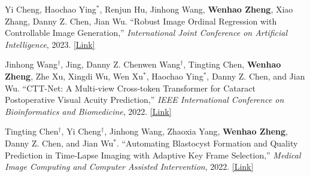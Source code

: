 \begin{cventries}
{\begin{cvitemize2}
            \vspace{1mm}
            \item Yi Cheng, Haochao Ying$^*$, Renjun Hu, Jinhong Wang, \textbf{Wenhao Zheng}, Xiao Zhang, Danny Z. Chen, Jian Wu. ``Robust Image Ordinal Regression with Controllable Image Generation,'' \textit{International Joint Conference on Artificial Intelligence}, 2023. \href{https://arxiv.org/abs/2305.04213}{\textcolor{link}{[Link]}}
            \vspace{1mm}
            \item Jinhong Wang$^\dagger$, Jing, Danny Z. Chenwen Wang$^\dagger$, Tingting Chen, \textbf{Wenhao Zheng}, Zhe Xu, Xingdi Wu, Wen Xu$^*$, Haochao Ying$^*$, Danny Z. Chen, and Jian Wu. ``CTT-Net: A Multi-view Cross-token Transformer for Cataract Postoperative Visual Acuity Prediction,'' \textit{IEEE International Conference on Bioinformatics and Biomedicine}, 2022. \href{https://ieeexplore.ieee.org/document/9995392}{\textcolor{link}{[Link]}}
            \vspace{1mm}
            \item Tingting Chen$^\dagger$, Yi Cheng$^\dagger$, Jinhong Wang, Zhaoxia Yang, \textbf{Wenhao Zheng}, Danny Z. Chen, and Jian Wu$^*$. ``Automating Blastocyst Formation and Quality Prediction in Time-Lapse Imaging with Adaptive Key Frame Selection,'' \textit{Medical Image Computing and Computer Assisted Intervention}, 2022. \href{https://link.springer.com/chapter/10.1007/978-3-031-16440-8_43}{\textcolor{link}{[Link]}}
        \end{cvitemize2}
    }
\end{cventries}
